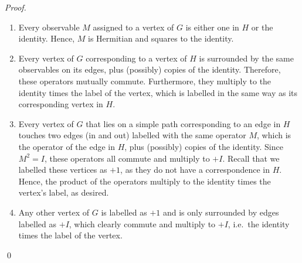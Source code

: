 \documentclass{llncs}
\begin{document}
\begin{proof}
  \begin{enumerate}
  \item Every observable \(M\) assigned to a vertex of \(G\) is either one in \(H\) or
    the identity. Hence, \(M\) is Hermitian and squares to the identity.

  \item Every vertex of \(G\) corresponding to a vertex of \(H\) is
    surrounded by the same observables on its edges, plus (possibly)
    copies of the identity. Therefore, these operators mutually
    commute. Furthermore, they multiply to the identity times the
    label of the vertex, which is labelled in the same way as its
    corresponding vertex in \(H\).

  \item Every vertex of \(G\) that lies on a simple path corresponding
    to an edge in \(H\) touches two edges (in and out) labelled with
    the same operator \(M\), which is the operator of the edge in
    \(H\), plus (possibly) copies of the identity. Since
    \(M^{2} = I\), these operators all commute and multiply to
    \(+I\). Recall that we labelled these vertices as \(+1\), as they
    do not have a correspondence in \(H\). Hence, the product of the
    operators multiply to the identity times the vertex's label, as
    desired.

  \item Any other vertex of \(G\) is labelled as \(+1\) and is only
    surrounded by edges labelled as \(+I\), which clearly commute
    and multiply to \(+I\), i.e.\ the identity times the label of the vertex.
  \end{enumerate}
  \qed
\end{proof}
\end{document}
